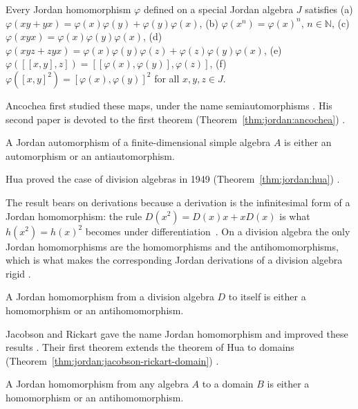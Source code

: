 \begin{proposition}\label{prop:jordan:jordan-hom-rules}
Every Jordan homomorphism $\varphi$ defined on a special Jordan algebra $J$ satisfies
(a) $\varphi(xy+yx)=\varphi(x)\varphi(y)+\varphi(y)\varphi(x)$,
(b) $\varphi(x^{n})=\varphi(x)^{n}$, $n\in\mathbb{N}$,
(c) $\varphi(xyx)=\varphi(x)\varphi(y)\varphi(x)$,
(d) $\varphi(xyz+zyx)=\varphi(x)\varphi(y)\varphi(z)+\varphi(z)\varphi(y)\varphi(x)$,
(e) $\varphi([[x,y],z])=[[\varphi(x),\varphi(y)],\varphi(z)]$,
(f) $\varphi([x,y]^{2})=[\varphi(x),\varphi(y)]^{2}$
for all $x,y,z\in J$.
\end{proposition}

Ancochea first studied these maps, under the name semiautomorphisms
\cite[p.~211]{BresarZelmanov2025}. His second paper is devoted to the first theorem (Theorem~\ref{thm:jordan:ancochea})
\cite[p.~211]{BresarZelmanov2025}.\begin{theorem}\label{thm:jordan:ancochea}
A Jordan automorphism of a finite-dimensional simple algebra $A$ is either an automorphism or an
antiautomorphism.
\end{theorem}

Hua proved the case of division algebras in 1949
(Theorem~\ref{thm:jordan:hua}) \cite[p.~211]{BresarZelmanov2025}.

The result bears on derivations because a derivation is the infinitesimal form
of a Jordan homomorphism: the rule $D(x^2)=D(x)x+xD(x)$ is what
$h(x^2)=h(x)^2$ becomes under differentiation~\cite[Section~1, p.~203]{BresarZelmanov2025}. On a division algebra the
only Jordan homomorphisms are the homomorphisms and the antihomomorphisms,
which is what makes the corresponding Jordan derivations of a division
algebra rigid \cite[Section~1, p.~203]{BresarZelmanov2025}.

\begin{theorem}\label{thm:jordan:hua}
A Jordan homomorphism from a division algebra $D$ to itself is either a homomorphism or an
antihomomorphism.
\end{theorem}

Jacobson and Rickart gave the name Jordan homomorphism and improved these results
\cite[p.~211]{BresarZelmanov2025}. Their first theorem extends the theorem of Hua to domains (Theorem~\ref{thm:jordan:jacobson-rickart-domain})
\cite[p.~211]{BresarZelmanov2025}.\begin{theorem}\label{thm:jordan:jacobson-rickart-domain}
A Jordan homomorphism from any algebra $A$ to a domain $B$ is either a homomorphism or an
antihomomorphism.
\end{theorem}


